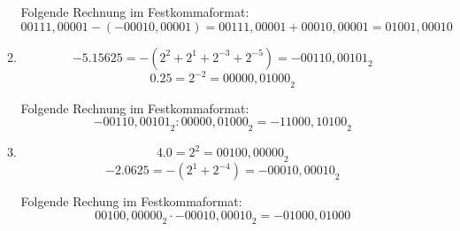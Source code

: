 \documentclass[DIN, pagenumber=false, fontsize=11pt, parskip=half]{scrartcl}
\begin{document}
\begin{enumerate}[label=(\alph*)]
\begin{enumerate}[label=(\roman*)]
                    Folgende Rechnung im Festkommaformat:
                    \begin{equation*}
                        00111,00001 - (-00010,00001) = 00111,00001 + 00010,00001 = 01001,00010
                    \end{equation*}

                \item 
                    \begin{equation*}
                        -5.15625 = -(2^2 + 2^1 + 2^{-3} + 2^{-5}) = -{00110,00101}_2
                    \end{equation*}
                    \begin{equation*}
                        0.25 = 2^{-2} = {00000,01000}_2
                    \end{equation*}

                    Folgende Rechnung im Festkommaformat:
                    \begin{equation*}
                        -{00110,00101}_2 : {00000,01000}_2 = -{11000,10100}_2
                    \end{equation*}

                \item
                    \begin{equation*}
                        4.0 = 2^2 = {00100,00000}_2
                    \end{equation*}
                    \begin{equation*}
                        -2.0625 = -(2^1 + 2^{-4}) = -{00010,00010}_2
                    \end{equation*}

                    Folgende Rechung im Festkommaformat:
                    \begin{equation*}
                        {00100,00000}_2 \cdot -{00010,00010}_2 = -{01000,01000}
                    \end{equation*}
            \end{enumerate}
    \end{enumerate}
\end{document}
